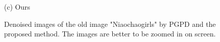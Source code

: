 \documentclass[runningheads]{llncs}
\begin{document}
\begin{figure}
{\begin{minipage}[t]{0.33\textwidth}
{\footnotesize (c) Ours }
\end{minipage}
}
\caption{Denoised images of the old image "Niaochaogirls" by PGPD and the proposed method. The images are better to be zoomed in on screen.}
\label{fig38}
\end{figure}
\end{document}
